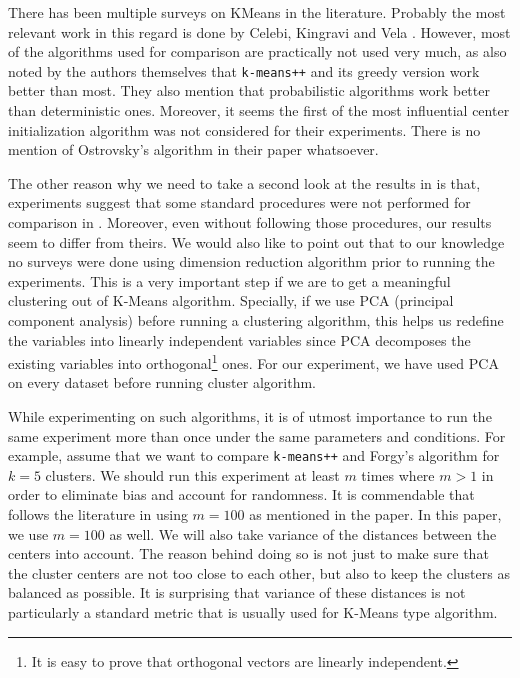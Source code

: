 \documentclass[10pt, leqno]{article}
\begin{document}
	There has been multiple surveys on KMeans in the literature. Probably the most relevant work in this regard is done by Celebi, Kingravi and Vela \cite{celebi}. However, most of the algorithms used for comparison are practically not used very much, as also noted by the authors themselves that \texttt{k-means++} and its greedy version work better than most. They also mention that probabilistic algorithms work better than deterministic ones. Moreover, it seems the first of the most influential center initialization algorithm \cite{ostrovsky} was not considered for their experiments. There is no mention of Ostrovsky's algorithm in their paper whatsoever.
	
	The other reason why we need to take a second look at the results in \cite{kmeans++} is that, experiments suggest that some standard procedures were not performed for comparison in \cite{kmeans++}. Moreover, even without following those procedures, our results seem to differ from theirs. We would also like to point out that to our knowledge no surveys were done using dimension reduction algorithm prior to running the experiments. This is a very important step if we are to get a meaningful clustering out of K-Means algorithm. Specially, if we use PCA (principal component analysis) before running a clustering algorithm, this helps us redefine the variables into linearly independent variables since PCA decomposes the existing variables into orthogonal\footnote{It is easy to prove that orthogonal vectors are linearly independent.} ones. For our experiment, we have used PCA on every dataset before running cluster algorithm.
	
	While experimenting on such algorithms, it is of utmost importance to run the same experiment more than once under the same parameters and conditions. For example, assume that we want to compare \texttt{k-means++} and Forgy's algorithm \cite{forgy} for $k=5$ clusters. We should run this experiment at least $m$ times where $m>1$ in order to eliminate bias and account for randomness. It is commendable that \cite{celebi} follows the literature in using $m=100$ as mentioned in the paper. In this paper, we use $m=100$ as well. We will also take variance of the distances between the centers into account. The reason behind doing so is not just to make sure that the cluster centers are not too close to each other, but also to keep the clusters as balanced as possible. It is surprising that variance of these distances is not particularly a standard metric that is usually used for K-Means type algorithm. 
	
\end{document}
